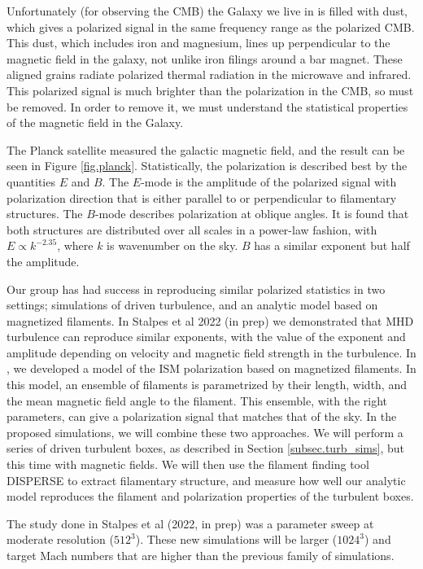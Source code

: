 Unfortunately (for observing the CMB) the Galaxy we live in is filled with dust,
which gives a polarized signal in the same frequency range as the polarized CMB.
This dust, which includes iron and magnesium, lines up perpendicular to the magnetic
field in the galaxy, not unlike iron filings around a bar magnet.  These aligned
grains radiate polarized thermal radiation in the microwave and infrared.  This
polarized signal is much brighter than the polarization in the CMB, so must be
removed.  In order to remove it, we must understand the statistical properties
of the magnetic field in the Galaxy.

The Planck satellite \citep{PlanckXIX15} measured the galactic magnetic field, and the result can be
seen in Figure \ref{fig.planck}.  Statistically, the polarization is described best
by the quantities $E$ and $B$.  The $E$-mode is the amplitude of the polarized
signal with polarization direction
that is either parallel to or perpendicular to filamentary structures.   The
$B$-mode
describes polarization at oblique angles.  It is found that both structures are
distributed over all scales in a power-law fashion, with $E \propto k^{-2.35}$,
where $k$ is wavenumber on the sky. $B$ has a similar exponent but half the
amplitude.  

Our group has had success in reproducing similar polarized statistics in two
settings; simulations of driven turbulence, and an analytic model based on
magnetized filaments.
In Stalpes et al 2022 (in prep)  we demonstrated that MHD turbulence can reproduce
similar exponents, with the value of the exponent and amplitude depending on
velocity and magnetic field strength in the turbulence.  In
\citet{Huffenberger20}, we developed a model of the ISM polarization based on
magnetized filaments.   In this model, an ensemble of filaments is parametrized
by their length, width, and the mean magnetic field angle to the filament.  This
ensemble, with the right parameters, can give a polarization signal that matches
that of the sky.
In the proposed simulations, we will combine these two approaches.  We will
perform a series of driven turbulent boxes, as described in
Section \ref{subsec.turb_sims}, but this
time with magnetic fields.  We will then use the filament finding tool DISPERSE
\citep{Sousbie11} to extract filamentary structure, and measure how well our
analytic model reproduces the filament and polarization properties of the
turbulent boxes.

The study done in Stalpes et al (2022, in prep) was a parameter sweep at
moderate resolution ($512^3$).  These new simulations will be larger ($1024^3$)
and target Mach numbers that are higher than the previous family of simulations.

